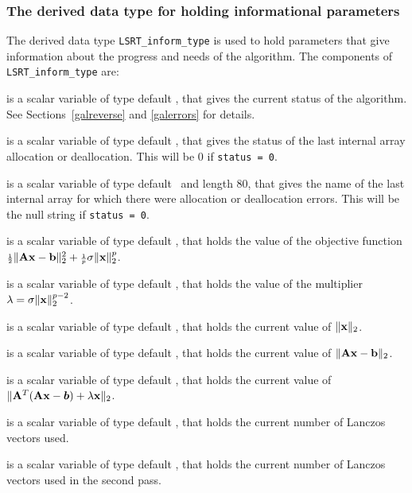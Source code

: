 \documentclass{galahad}
\newcommand{\packagename}{LS\-RT}
\begin{document}

\subsubsection{The derived data type for holding informational
 parameters}\label{typeinform}
The derived data type 
{\tt \packagename\_inform\_type} 
is used to hold parameters that give information about the progress and needs 
of the algorithm. The components of
{\tt \packagename\_inform\_type} 
are:

\begin{description}
 is a scalar variable of type default \integer, that gives the 
current status of the algorithm. See Sections~\ref{galreverse} and 
\ref{galerrors} for details. 

 is a scalar variable of type default \integer, 
that gives the status of the last internal array allocation 
or deallocation. This will be 0 if {\tt status = 0}.

 is a scalar variable of type default \character\
and length 80, that  gives the name of the last internal array 
for which there were allocation or deallocation errors.
This will be the null string if {\tt status = 0}. 

 is a scalar variable of type default 
\realdp, that holds the value of the objective function
${\scriptstyle \frac{1}{2}}\| {\mathbf{A}} {\mathbf{x}} - {\mathbf{b}}\|_2^2 + {\scriptstyle \frac{1}{p}} \sigma \| {\mathbf{x}} \|_2^p$.
 
 is a scalar variable of type default 
\realdp, that holds the 
value of the multiplier $\lambda = \sigma \|{\mathbf{x}}\|_2^{p-2}$.
 
 is a scalar variable of type default \realdp, 
that holds the current value of $\|{\mathbf{x}}\|_2$.
 
 is a scalar variable of type default \realdp, 
that holds the current value of $\|{\mathbf{A}}{\mathbf{x}}-{\mathbf{b}}\|_2$.
 
 is a scalar variable of type default \realdp, 
that holds the current value of 
$\|{\mathbf{A}}^T ( {\mathbf{A}} {\mathbf{x}} - \bm b ) + \lambda {\mathbf{x}} \|_2$.
 
 is a scalar variable of type default \integer, that holds the 
current number of Lanczos vectors used. 
 
 is a scalar variable of type default \integer, that holds the 
current number of Lanczos vectors used in the second pass. 
 
\end{description}
\end{document}
